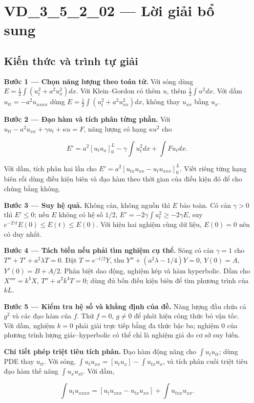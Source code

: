 \documentclass[10pt,a4paper]{article}
\begin{document}
\section*{VD\_3\_5\_2\_02 — Lời giải bổ sung}
\subsection*{Kiến thức và trình tự giải}
\textbf{Bước 1 — Chọn năng lượng theo toán tử.} Với sóng dùng $E=\frac12\int(u_t^2+a^2u_x^2)dx$. Với Klein–Gordon có thêm $u$, thêm $\frac12\int u^2dx$. Với dầm $u_{tt}=-a^2u_{xxxx}$ dùng $E=\frac12\int(u_t^2+a^2u_{xx}^2)dx$, không thay $u_{xx}$ bằng $u_x$.

\textbf{Bước 2 — Đạo hàm và tích phân từng phần.} Với $u_{tt}-a^2u_{xx}+\gamma u_t+\kappa u=F$, năng lượng có hạng $\kappa u^2$ cho


\[
E'=a^2[u_tu_x]_0^L-\gamma\int u_t^2dx+\int Fu_tdx.
\]


Với dầm, tích phân hai lần cho $E'=a^2[u_{tx}u_{xx}-u_tu_{xxx}]_0^L$. Viết riêng từng hạng biên rồi dùng điều kiện biên và đạo hàm theo thời gian của điều kiện đó để cho chúng bằng không.

\textbf{Bước 3 — Suy hệ quả.} Không cản, không nguồn thì $E$ bảo toàn. Có cản $\gamma>0$ thì $E'\le0$; nếu $E$ không có hệ số $1/2$, $E'=-2\gamma\int u_t^2\ge-2\gamma E$, suy $e^{-2\gamma t}E(0)\le E(t)\le E(0)$. Với hiệu hai nghiệm cùng dữ liệu, $E(0)=0$ nên có duy nhất.

\textbf{Bước 4 — Tách biến nếu phải tìm nghiệm cụ thể.} Sóng có cản $\gamma=1$ cho $T''+T'+a^2\lambda T=0$. Đặt $T=e^{-t/2}Y$, thu $Y''+(a^2\lambda-1/4)Y=0$, $Y(0)=A$, $Y'(0)=B+A/2$. Phân biệt dao động, nghiệm kép và hàm hyperbolic. Dầm cho $X''''=k^4X$, $T''+a^2k^4T=0$; dùng đủ bốn điều kiện biên để tìm phương trình của $kL$.

\textbf{Bước 5 — Kiểm tra hệ số và khẳng định của đề.} Năng lượng đầu chứa cả $g^2$ và các đạo hàm của $f$. Thử $f=0$, $g\ne0$ để phát hiện công thức bỏ vận tốc. Với dầm, nghiệm $k=0$ phải giải trực tiếp bằng đa thức bậc ba; nghiệm $0$ của phương trình lượng giác–hyperbolic có thể chỉ là nghiệm giả do cơ sở suy biến.

\textbf{Chi tiết phép triệt tiêu tích phân.} Đạo hàm động năng cho $\int u_tu_{tt}$; dùng PDE thay $u_{tt}$. Với sóng, $\int u_tu_{xx}=[u_tu_x]-\int u_{tx}u_x$, và tích phân cuối triệt tiêu đạo hàm thế năng $\int u_xu_{xt}$. Với dầm,


\[
\int u_tu_{xxxx}=[u_tu_{xxx}-u_{tx}u_{xx}]+\int u_{txx}u_{xx}.
\]
\end{document}
